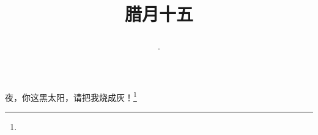 \title{\date[d=25,m=1,y=2024][year:cn-y,年,month:cn,day:cn,日,·,weekday]·腊月十五 }
夜，你这黑太阳，请把我烧成灰！\footnote{ }

